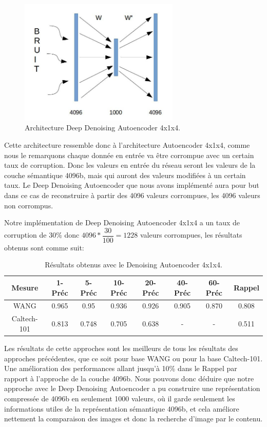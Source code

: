 \begin{figure}[H]
	\centering
		\includegraphics[width=3in]{Figures/ae/denoising.jpg}
	\caption[An Electron]{Architecture Deep Denoising Autoencoder 4x1x4.}
	\label{fig:Electron}
\end{figure}

	Cette architecture ressemble donc à l'architecture Autoencoder 4x1x4, comme nous le remarquons chaque donnée en entrée va être corrompue avec un certain taux de corruption. Donc les valeurs en entrée du réseau seront les valeurs de la couche sémantique 4096b, mais qui auront des valeurs modifiées à un certain taux. Le Deep Denoising Autoencoder que nous avons implémenté aura pour but dans ce cas de reconstruire à partir des 4096 valeurs corrompues, les 4096 valeurs non corrompus.
	
	Notre implémentation de Deep Denoising Autoencoder 4x1x4  a un taux de corruption de 30\% donc $4096 * \dfrac{30}{100} = 1228$ valeurs corrompues, les résultats obtenus sont comme suit:


\begin{table}[H]
\begin{center}
\begin{tabular}{|c|c|c|c|c|c|c|c|}
\hline
	Mesure & 1-Préc & 5-Préc & 10-Préc & 20-Préc & 40-Préc & 60-Préc & Rappel\\
\hline
	WANG & 0.965 & 0.95 & 0.936 & 0.926 & 0.905 & 0.870 & 0.808\\
\hline
	Caltech-101 & 0.813 & 0.748 & 0.705 & 0.638 & - & - & 0.511\\
\hline
\end{tabular}
\end{center}
\caption{Résultats obtenus avec le Denoising Autoencoder 4x1x4.}
\end{table}

	Les résultats de cette approches sont les meilleurs de tous les résultats des approches précédentes, que ce soit pour base WANG ou pour la base Caltech-101. Une amélioration des performances allant jusqu'à 10\% dans le Rappel par rapport à l'approche de la couche 4096b.
	Nous pouvons donc déduire que notre approche avec le Deep Denoising Autoencoder a pu construire une représentation compressée de 4096b en seulement 1000 valeurs, où il garde seulement les informations utiles de la représentation sémantique 4096b, et cela améliore nettement la comparaison des images et donc la recherche d'image par le contenu. 


